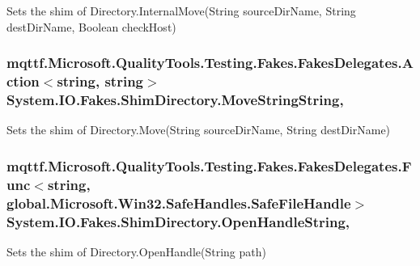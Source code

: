 Sets the shim of Directory.\-Internal\-Move(\-String source\-Dir\-Name, String dest\-Dir\-Name, Boolean check\-Host)

\hypertarget{class_system_1_1_i_o_1_1_fakes_1_1_shim_directory_aaed2984a84b57b807c87c65a771fb34e}{
\subsubsection[{Move\-String\-String}]{\setlength{\rightskip}{0pt plus 5cm}mqttf.\-Microsoft.\-Quality\-Tools.\-Testing.\-Fakes.\-Fakes\-Delegates.\-Action$<$string, string$>$ System.\-I\-O.\-Fakes.\-Shim\-Directory.\-Move\-String\-String\hspace{0.3cm}{\ttfamily [static]}, {\ttfamily [set]}}}\label{class_system_1_1_i_o_1_1_fakes_1_1_shim_directory_aaed2984a84b57b807c87c65a771fb34e}


Sets the shim of Directory.\-Move(\-String source\-Dir\-Name, String dest\-Dir\-Name)

\hypertarget{class_system_1_1_i_o_1_1_fakes_1_1_shim_directory_adea9a4c704576ff74b0154ef7045868c}{
\subsubsection[{Open\-Handle\-String}]{\setlength{\rightskip}{0pt plus 5cm}mqttf.\-Microsoft.\-Quality\-Tools.\-Testing.\-Fakes.\-Fakes\-Delegates.\-Func$<$string, global.\-Microsoft.\-Win32.\-Safe\-Handles.\-Safe\-File\-Handle$>$ System.\-I\-O.\-Fakes.\-Shim\-Directory.\-Open\-Handle\-String\hspace{0.3cm}{\ttfamily [static]}, {\ttfamily [set]}}}\label{class_system_1_1_i_o_1_1_fakes_1_1_shim_directory_adea9a4c704576ff74b0154ef7045868c}


Sets the shim of Directory.\-Open\-Handle(\-String path)

